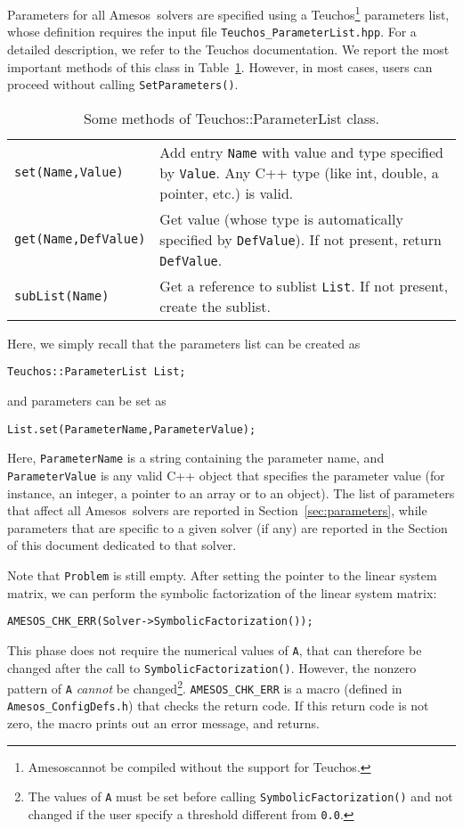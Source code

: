 \documentclass[11pt]{SANDreport}
\newcommand{\amesos}{{\sc Amesos}}
\newcommand{\teuchos}{{\sc Teuchos}}
\begin{document}
Parameters for all \amesos\ solvers are specified using a 
Teuchos\footnote{\amesos cannot be compiled without 
  the support for \teuchos.} 
parameters list, whose
definition requires the input file \verb!Teuchos_ParameterList.hpp!. For
a detailed description, we refer to the Teuchos documentation. We report
the most important methods of this class in Table~\ref{tab:teuchos}.
However, in most cases, users can proceed without calling
\verb!SetParameters()!.

\begin{table}[htbp]
  \centering
  \begin{tabular}{| p{4cm} | p{10cm} |}
    \hline
    \verb!set(Name,Value)! & Add entry \verb!Name! with value and type
    specified by \verb!Value!. Any C++ type (like int, double, a
    pointer, etc.) is valid. \\
    \verb!get(Name,DefValue)! & Get value (whose type is automatically
    specified by \verb!DefValue!). If not present, return
    \verb!DefValue!. \\
    \verb!subList(Name)! & Get a reference to sublist \verb!List!. If not
    present, create the sublist. \\
    \hline
  \end{tabular}
  \caption{Some methods of Teuchos::ParameterList class.}
  \label{tab:teuchos}
\end{table}

Here, we simply recall that the parameters list can be created as
\begin{verbatim}
Teuchos::ParameterList List;
\end{verbatim}
and parameters can be set as
\begin{verbatim}
List.set(ParameterName,ParameterValue);
\end{verbatim}
Here, \verb!ParameterName! is a string containing the parameter name,
and \verb!ParameterValue! is any valid C++ object that specifies the
parameter value (for instance, an integer, a pointer to an array or to
an object). The list of parameters that affect all \amesos\ solvers are
reported in Section~\ref{sec:parameters}, while parameters that are specific
to a given solver (if any) are reported in the Section of this document
dedicated to that solver.

\medskip

Note that \verb!Problem! is still empty. After setting the pointer to
the linear system matrix, we can perform the symbolic factorization
of the linear system matrix:
\begin{verbatim}
AMESOS_CHK_ERR(Solver->SymbolicFactorization());
\end{verbatim}
This phase does not require the numerical values of \verb!A!, that can
therefore be changed after the call to \verb!SymbolicFactorization()!.
However,  the nonzero pattern of \verb!A! {\em cannot} be
changed\footnote{The values of {\tt A} must
  be set before calling {\tt SymbolicFactorization()} and not changed
  if the user specify a threshold different from {\tt 0.0}.}.
\verb!AMESOS_CHK_ERR! is a macro (defined in \verb!Amesos_ConfigDefs.h!)
that checks the return code. If this return code is not zero, the
macro prints out an error message, and returns.
\end{document}
